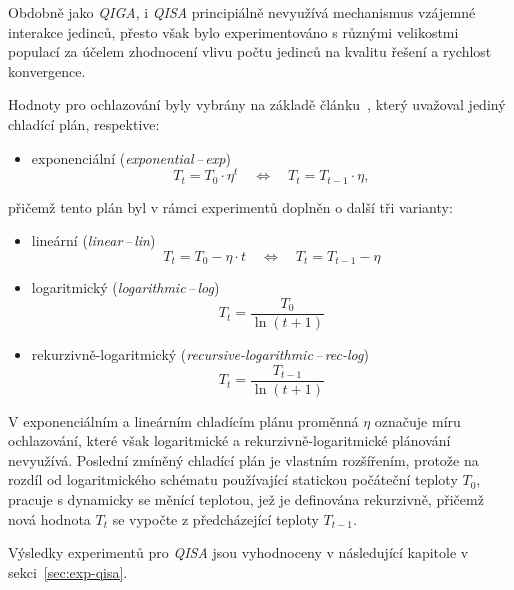 Obdobně jako \emph{QIGA}, i \emph{QISA} principiálně nevyužívá mechanismus vzájemné interakce jedinců, přesto však bylo experimentováno s různými velikostmi populací za účelem zhodnocení vlivu počtu jedinců na kvalitu řešení a rychlost konvergence. 

Hodnoty pro ochlazování byly vybrány na základě článku~\cite{qisa}, který uvažoval jediný chladící plán, respektive:
\begin{itemize}
    \item exponenciální (\emph{exponential\,--\,exp})~\cite{qisa,sa-cooling}
    \begin{equation}\label{eq:qisa-exp}
        T_t = T_0 \cdot \eta^t \quad\Longleftrightarrow\quad T_t = T_{t-1} \cdot \eta,
    \end{equation}
\end{itemize}
přičemž tento plán byl v rámci experimentů doplněn o další tři varianty:
\begin{itemize}
    \item lineární (\emph{linear\,--\,lin})~\cite{sa-cooling}
    \begin{equation}\label{eq:qisa-lin}
        T_t = T_0 - \eta \cdot t \quad\Longleftrightarrow\quad T_t = T_{t-1} - \eta
    \end{equation}
    \item logaritmický (\emph{logarithmic\,--\,log})~\cite{metaheuristics,sa-cooling, banchs_simulated_annealing}
    \begin{equation}\label{eq:qisa-log}
        T_t = \frac{T_0}{\ln\left(t+1\right)}
    \end{equation}
    \item rekurzivně-logaritmický (\emph{recursive-logarithmic\,--\,rec-log})
    \begin{equation}\label{eq:qisa-rec-log}
        T_t = \frac{T_{t-1}}{\ln\left(t+1\right)}
    \end{equation}
\end{itemize}
V exponenciálním a lineárním chladícím plánu proměnná $\eta$ označuje míru ochlazování, které však logaritmické a rekurzivně-logaritmické plánování nevyužívá.  
Poslední zmíněný chladící plán je vlastním rozšířením, protože na rozdíl od logaritmického schématu používající statickou počáteční teploty $T_0$, pracuje s dynamicky se měnící teplotou, jež je definována rekurzivně, přičemž nová hodnota $T_t$ se vypočte z předcházející teploty $T_{t-1}$.

Výsledky experimentů pro \emph{QISA} jsou vyhodnoceny v následující kapitole v sekci~\ref{sec:exp-qisa}.

